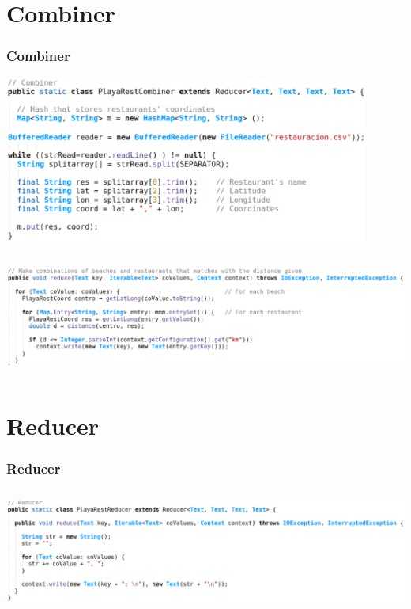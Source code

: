 \documentclass{beamer}
\begin{document}
\section{Combiner}
\begin{frame}[allowframebreaks]
  \frametitle{Combiner}  
  
  \includegraphics[width=0.9\textwidth]{img/2.eps}
  \hspace*{0.3cm}
  \newline
  \newline
  \includegraphics[width=0.9\textwidth]{img/3.eps}
  \framebreak
  
  \includegraphics[width=1.05\textwidth,height=4cm]{img/4.eps}
  
\end{frame}

\section{Reducer}
\begin{frame}
  \frametitle{Reducer}  
  
  \includegraphics[width=\textwidth,height=4cm]{img/5.eps}

\end{frame}
\end{document}
